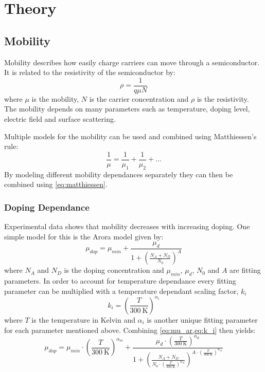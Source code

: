\section{Theory}

\subsection{Mobility} \label{sec:mobility}
Mobility describes how easily charge carriers can move through a semiconductor. It is related to the resistivity of the semiconductor by:
\begin{equation} \label{eq:res_mu}
\rho = \frac{1}{q \mu N}
\end{equation}
where $\mu$ is the mobility, $N$ is the carrier concentration and $\rho$ is the resistivity. The mobility depends on many parameters such as temperature, doping level, electric field and surface scattering. \cite{Baliga2019}


Multiple models for the mobility can be used and combined using Matthiessen's rule:
\begin{equation} \label{eq:matthiessen}
    \frac{1}{\mu} = \frac{1}{\mu_1} + \frac{1}{\mu_2} + \dots 
\end{equation}
By modeling different mobility dependances separately they can then be combined using \cref{eq:matthiessen}.

\subsubsection{Doping Dependance}
Experimental data shows that mobility decreases with increasing doping. One simple model for this is the Arora model given by:
\begin{equation} \label{eq:mu_ar}
    \mu_{dop} = \mu_{min} + \frac{\mu_d}{1 + \left(\frac{N_A + N_D}{N_0}\right)^A}
\end{equation}
where $N_A$ and $N_D$ is the doping concentration and $\mu_{min}$, $\mu_d$, $N_0$ and $A$ are fitting parameters. In order to account for temperature dependance every fitting parameter can be multiplied with a temperature dependant scaling factor, $k_i$
\begin{equation} \label{eq:k_i}
    k_i = \left(\frac{T}{\SI{300}{\kelvin}}\right)^{\alpha_i}
\end{equation}
where $T$ is the temperature in Kelvin and $\alpha_i$ is another unique fitting parameter for each parameter mentioned above. Combining \cref{eq:mu_ar,eq:k_i} then yields:
\begin{equation} \label{eq:mu_ar_full}
    \mu_{dop} = \mu_{min} \cdot \left( \frac{T}{\SI{300}{\kelvin}} \right)^{\alpha_m} + %
    \frac{\mu_d \cdot \left( \frac{T}{\SI{300}{\kelvin}} \right)^{\alpha_d}} %
    {1 + \left( \frac{N_A + N_D}{N_0 \cdot \left( \frac{T}{\SI{300}{\kelvin}} \right)^{\alpha_N}} \right)^{A \cdot \left( \frac{T}{\SI{300}{\kelvin}} \right)^{\alpha_A}}}
\end{equation}


